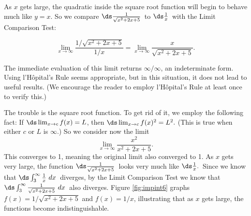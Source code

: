 \begin{solution}
{As $x$ gets large, the quadratic inside the square root function will begin to behave much like $y=x$. So we compare \small$\ds\frac{1}{\sqrt{x^2+2x+5}}$\normalsize\ to \small$\ds\frac1x$\normalsize\ with the Limit Comparison Test:

$$
\lim_{x\to\infty} \frac{1/\sqrt{x^2+2x+5}}{1/x} = \lim_{x\to\infty}\frac{x}{\sqrt{x^2+2x+5}}.$$

The immediate evaluation of this limit returns $\infty/\infty$, an indeterminate form. Using l'H\^opital's Rule seems appropriate, but in this situation, it does not lead to useful results. (We encourage the reader to employ l'H\^opital's Rule at least once to verify this.)

The trouble is the square root function. To get rid of it, we employ the following fact: If $\ds \lim_{x\to c} f(x) = L$, then $\ds\lim_{x\to c} f(x)^2 = L^2.$ (This is true when either $c$ or $L$ is $\infty$.) So we consider now the limit
$$\lim_{x\to\infty} \frac{x^2}{x^2+2x+5}.$$ This converges to 1, meaning the original limit also converged to 1. As $x$ gets very large, the function 
\small$\ds\frac{1}{\sqrt{x^2+2x+5}}$\normalsize\ looks very much like \small$\ds\frac1x.$\normalsize\ 
Since we know that \small$\ds\int_3^{\infty} \frac1x\ dx$\normalsize\ diverges, by the Limit Comparison Test we know that \small$\ds\int_3^\infty\frac{1}{\sqrt{x^2+2x+5}}\ dx$\normalsize\ also diverges. Figure \ref{fig:impint6} graphs $f(x)=1/\sqrt{x^2+2x+5}$ and $f(x)=1/x$, illustrating that as $x$ gets large, the functions become indistinguishable.
}
\end{solution}
